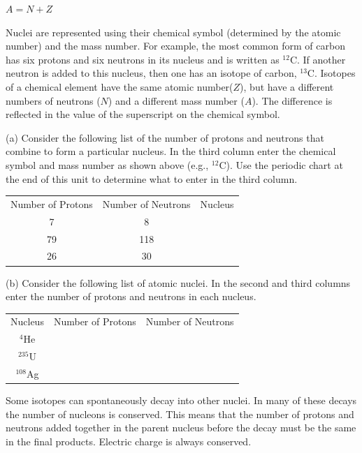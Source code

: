 {\centering $A = N + Z$\par}

Nuclei are represented using their chemical symbol (determined by
the atomic number) and the mass number. For example, the most common
form of carbon has six protons and six neutrons in its nucleus and
is written as \( ^{12} \)C. If another neutron is added to this nucleus,
then one has an isotope of carbon, \( ^{13} \)C. Isotopes of a chemical element
have the same atomic number($Z$), but have a different numbers of neutrons
($N$) and a different mass number ($A$). The difference is reflected in
the value of the superscript on the chemical symbol.

(a) Consider the following list of the number of protons and neutrons
that combine to form a particular nucleus. In the third column enter the chemical
symbol and mass number as shown above (e.g., \( ^{12} \)C). Use the
periodic chart at the end of this unit to determine what to enter in the third
column.

\vspace{0.3cm}
{\renewcommand{\arraystretch}{1.1}
{\centering \begin{tabular}{|c|c|c|}
\hline 
Number of Protons&
Number of Neutrons&
Nucleus\\
\hhline{|=|=|=|}
7&
8&
\\
\hline 
79&
118&
\\
\hline 
26&
30&
\\
\hline
\end{tabular}\par}}
\vspace{0.3cm}

(b) Consider the following list of atomic nuclei. In the second and
third columns enter the number of protons and neutrons in each nucleus.

\vspace{0.3cm}
{\renewcommand{\arraystretch}{1.2}
{\centering \begin{tabular}{|c|c|c|}
\hline 
Nucleus&
Number of Protons&
Number of Neutrons\\
\hhline{|=|=|=|}
\( ^{4} \)He&
&
\\
\hline 
\( ^{235} \)U&
&
\\
\hline 
\( ^{108} \)Ag&
&
\\
\hline
\end{tabular}\par}}
\vspace{0.3cm}

Some isotopes can spontaneously decay into other nuclei.
In many of these decays the number of nucleons is conserved. 
This
means that the number of protons and neutrons added together in the parent nucleus before
the decay must be the same in the final products.
Electric charge
is always conserved.

